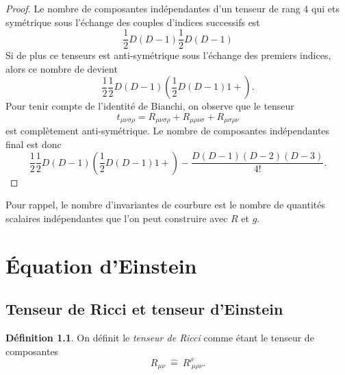 \documentclass[a4paper,11pt]{report}
\theoremstyle{definition}
\theoremstyle{plain}
\theoremstyle{definition}
\newtheorem{defn}{Définition}[chapter]
\theoremstyle{remark}
\begin{document}
                \begin{proof}
                    Le nombre de composantes indépendantes d'un tenseur de rang $4$ qui ets symétrique sous l'échange des couples d'indices successifs est 
                    \begin{equation}
                        \frac{1}{2}D(D-1)\frac{1}{2}D(D-1)
                    \end{equation}
                    Si de plus ce tenseurs est anti-symétrique sous l'échange des premiers indices, alors ce nombre de devient
                    \begin{equation}
                        \frac{1}{2}\frac{1}{2}D(D-1)\left( \frac{1}{2}D(D-1)1+ \right).
                    \end{equation}
                    Pour tenir compte de l'identité de Bianchi, on observe que le tenseur
                    \begin{equation}
                        t_{\mu\nu\sigma\rho} = R_{\mu\nu\sigma\rho}+R_{\mu\rho\nu\sigma}+R_{\mu\sigma\rho\nu}
                    \end{equation}
                    est complètement anti-symétrique. Le nombre de composantes indépendantes final est donc 
                    \begin{equation}
                        \frac{1}{2}\frac{1}{2}D(D-1)\left( \frac{1}{2}D(D-1)1+ \right)  -\frac{D(D-1)(D-2)(D-3)}{4!}.
                    \end{equation}
                \end{proof}
                
                Pour rappel, le nombre d'invariantes de courbure est le nombre de quantités scalaires indépendantes que l'on peut construire avec $R$ et $g$.
                
\chapter{Équation d'Einstein}

    
        
    \section{Tenseur de Ricci et tenseur d'Einstein}
        
        \begin{defn}
            On définit le \textit{tenseur de Ricci} comme étant le tenseur de composantes
            \begin{equation}
                R_{\mu\nu} ~\hat{=}~ R^\rho_{~\mu\rho\nu}.
            \end{equation}
        \end{defn}
        
\end{document}
